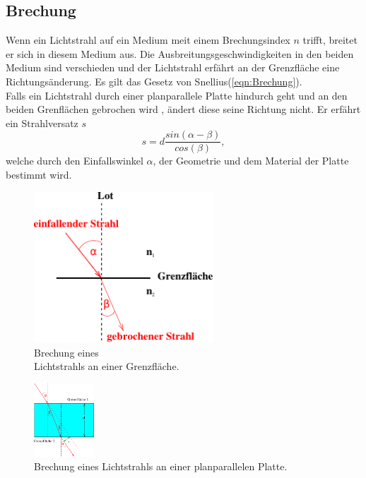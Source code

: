 \subsection{Brechung}
\label{subsec:Brechung}
\begin{minipage}[t]{0,5\textwidth}
    Wenn ein Lichtstrahl auf ein Medium meit einem Brechungsindex $n$ trifft, breitet er sich in diesem Medium aus. 
    Die Ausbreitungsgeschwindigkeiten in den beiden Medium sind verschieden und der Lichtstrahl erfährt an der Grenzfläche eine Richtungsänderung.
    Es gilt das Gesetz von Snellius(\ref{eqn:Brechung}).\\
    Falls ein Lichtstrahl durch einer planparallele Platte hindurch geht und an den beiden Grenflächen gebrochen wird , ändert diese seine Richtung nicht.
    Er erfährt ein Strahlversatz $s$
    \begin{equation}
        s = d\frac{sin(\alpha-\beta)}{cos(\beta)},
        \label{eqn:Strahlversatz}
    \end{equation}
    welche durch den Einfallswinkel $\alpha$, der Geometrie und dem Material der Platte bestimmt wird.

\end{minipage}
\begin{minipage}[t]{0,5\textwidth}
    \begin{figure}[H]
        \centering
        \includegraphics[width=0.6\textwidth]{build/Abb_2b.pdf}
        \caption {Brechung eines \\Lichtstrahls an einer Grenzfläche\cite[2]{V400}.}
        \label{fig:Abb_1}
    \end{figure}

\end{minipage}
    \begin{figure}[H]
        \centering
        \includegraphics[width=0.2\textwidth]{build/Abb_5.pdf}
        \caption {Brechung eines Lichtstrahls an einer planparallelen Platte\cite[2]{V400}.}
        \label{fig:Abb_1}
    \end{figure}

